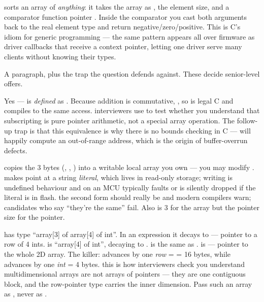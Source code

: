  sorts an array of \emph{anything}: it takes
the array as , the element size, and a comparator function
pointer . Inside the comparator
you cast both  arguments back to the real element type and
return negative/zero/positive. This is C's idiom for generic programming ---
the same pattern appears all over firmware as driver callbacks that receive a
 context pointer, letting one driver serve many clients
without knowing their types.

%
{A paragraph, plus the trap the question defends against. These decide
senior-level offers.}

Yes ---  is \emph{defined} as . Because
addition is commutative, , so  is
legal C and compiles to the same access. \trap interviewers use
 to test whether you understand that subscripting is pure
pointer arithmetic, not a special array operation. The follow-up trap is that
this equivalence is why there is no bounds checking in C ---
 will happily compute an out-of-range address, which is the
origin of buffer-overrun defects.

 copies the 3 bytes (, ,
) into a writable local array you own --- you may
modify .  makes  point at a string
\emph{literal}, which lives in read-only storage; writing 
is undefined behaviour and on an MCU typically faults or is silently dropped
if the literal is in flash. \trap the second form should really be
 and modern compilers warn; candidates who say ``they're
the same'' fail. Also  is 3 for the array but the pointer
size for the pointer.

 has type ``array[3] of array[4] of int''. In an expression it decays
to  --- pointer to a row of 4 ints.  is
``array[4] of int'', decaying to .  is the same as
.  is  --- pointer to the whole 2D
array. The killer:  advances by one \emph{row} =
 = 16 bytes, while  advances by one
\emph{int} = 4 bytes. \trap this is how interviewers check you understand
multidimensional arrays are not arrays of pointers --- they are one
contiguous block, and the row-pointer type carries the inner dimension. Pass
such an array as , never as
.


